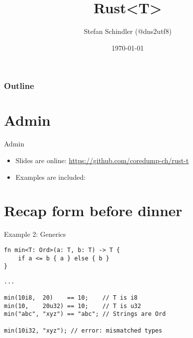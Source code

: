 \documentclass[aspectratio=1610,t]{beamer}
\title{Rust<T>}
\date{\today}
\author{Stefan Schindler (@dns2utf8)}
\institute{Coredump Rapperswil}
\begin{document}
{
\maketitle
}


\begin{frame}[noframenumbering]
	\frametitle{Outline}
	\tableofcontents
\end{frame}



\section{Admin}

\begin{frame}[fragile]{Admin}

\begin{itemize}
  \item Slides are online:
        \url{https://github.com/coredump-ch/rust-t}
  \item Examples are included:
        \url{}
\end{itemize}

\end{frame}


\section{Recap form before dinner}

\begin{frame}[fragile]{Example 2: Generics}

\begin{verbatim}
fn min<T: Ord>(a: T, b: T) -> T {
    if a <= b { a } else { b }
}
\end{verbatim}
\pause
\begin{verbatim}
...

min(10i8,  20)    == 10;    // T is i8
min(10,    20u32) == 10;    // T is u32
min("abc", "xyz") == "abc"; // Strings are Ord

min(10i32, "xyz"); // error: mismatched types
\end{verbatim}

\end{frame}
\end{document}
